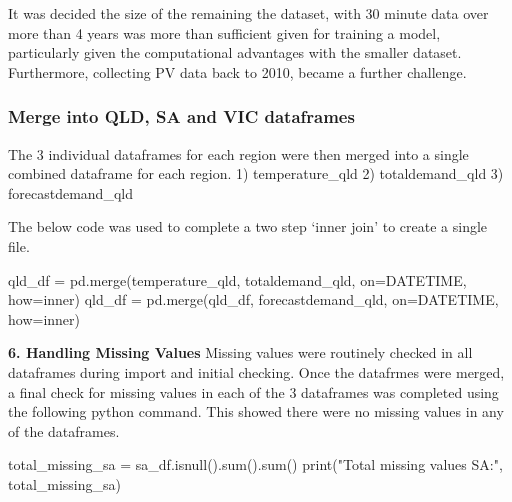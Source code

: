\documentclass[mstat,12pt]{unswthesis}
\newenvironment{Shaded}{}{}
\newcommand{\BuiltInTok}[1]{\textcolor[rgb]{0.00,0.50,0.00}{#1}}
\newcommand{\NormalTok}[1]{#1}
\newcommand{\OperatorTok}[1]{\textcolor[rgb]{0.40,0.40,0.40}{#1}}
\newcommand{\StringTok}[1]{\textcolor[rgb]{0.25,0.44,0.63}{#1}}
\begin{document}
It was decided the size of the remaining the dataset, with 30 minute
data over more than 4 years was more than sufficient given for training
a model, particularly given the computational advantages with the
smaller dataset. Furthermore, collecting PV data back to 2010, became a
further challenge.

\subsubsection{Merge into QLD, SA and VIC
dataframes}\label{merge-into-qld-sa-and-vic-dataframes}

The 3 individual dataframes for each region were then merged into a
single combined dataframe for each region. 1) temperature\_qld 2)
totaldemand\_qld 3) forecastdemand\_qld

The below code was used to complete a two step `inner join' to create a
single file.

\begin{Shaded}
\begin{Highlighting}[]
\NormalTok{qld\_df }\OperatorTok{=}\NormalTok{ pd.merge(temperature\_qld, totaldemand\_qld, on}\OperatorTok{=}\StringTok{\textquotesingle{}DATETIME\textquotesingle{}}\NormalTok{, how}\OperatorTok{=}\StringTok{\textquotesingle{}inner\textquotesingle{}}\NormalTok{)}
\NormalTok{qld\_df }\OperatorTok{=}\NormalTok{ pd.merge(qld\_df, forecastdemand\_qld, on}\OperatorTok{=}\StringTok{\textquotesingle{}DATETIME\textquotesingle{}}\NormalTok{, how}\OperatorTok{=}\StringTok{\textquotesingle{}inner\textquotesingle{}}\NormalTok{)}
\end{Highlighting}
\end{Shaded}

\textbf{6. Handling Missing Values} Missing values were routinely
checked in all dataframes during import and initial checking. Once the
datafrmes were merged, a final check for missing values in each of the 3
dataframes was completed using the following python command. This showed
there were no missing values in any of the dataframes.

\begin{Shaded}
\begin{Highlighting}[]
\NormalTok{total\_missing\_sa }\OperatorTok{=}\NormalTok{ sa\_df.isnull().}\BuiltInTok{sum}\NormalTok{().}\BuiltInTok{sum}\NormalTok{()}
\BuiltInTok{print}\NormalTok{(}\StringTok{"Total missing values SA:"}\NormalTok{, total\_missing\_sa)}
\end{Highlighting}
\end{Shaded}
\end{document}
